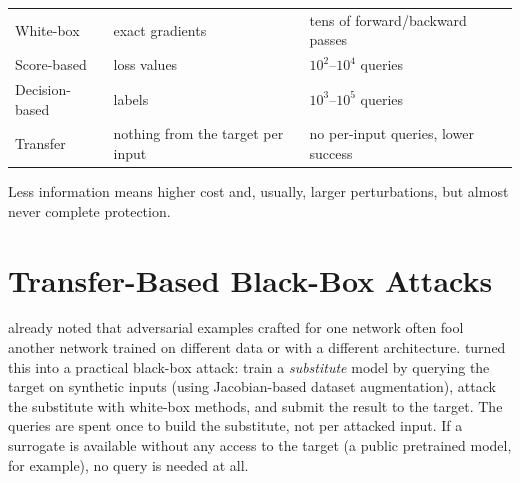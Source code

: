 \documentclass[10pt,a4paper]{extarticle}
\theoremstyle{definition}
\begin{document}
\begin{keybox}
\begin{tabular}{@{}lll@{}}
White-box & exact gradients & tens of forward/backward passes \\
Score-based & loss values & \(10^2\)--\(10^4\) queries \\
Decision-based & labels & \(10^3\)--\(10^5\) queries \\
Transfer & nothing from the target per input & no per-input queries, lower success \\
\end{tabular}

\smallskip
Less information means higher cost and, usually, larger perturbations, but almost never complete protection.
\end{keybox}

\section{Transfer-Based Black-Box Attacks}\label{sec:transfer}

\citet{szegedy2014intriguing} already noted that adversarial examples crafted for one network often fool another network trained on different data or with a different architecture. \citet{papernot2017practical} turned this into a practical black-box attack: train a \emph{substitute} model by querying the target on synthetic inputs (using Jacobian-based dataset augmentation), attack the substitute with white-box methods, and submit the result to the target. The queries are spent once to build the substitute, not per attacked input. If a surrogate is available without any access to the target (a public pretrained model, for example), no query is needed at all.
\end{document}
